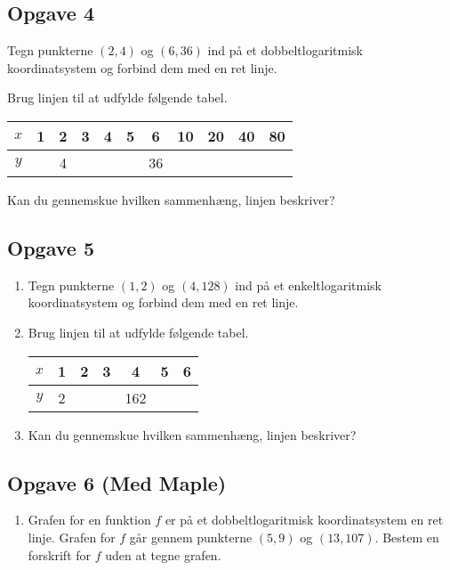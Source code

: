 \documentclass[12pt]{article}
\begin{document}
\subsection*{Opgave 4}

\begin{enumerate}[label=\roman*)]
	\item Tegn punkterne $(2,4)$ og $(6,36)$ ind på et dobbeltlogaritmisk koordinatsystem og forbind dem med 
	en ret linje.
	\item Brug linjen til at udfylde følgende tabel.
	\begin{center}
		\begin{tabular}{c|c|c|c|c|c|c|c|c|c|c}
			$x$ & 1 & 2 & 3 & 4 & 5 & 6 & 10 & 20 & 40 & 80 \\
			\hline
			$y$ & \phantom{1} & 4  & \phantom{8}  &\phantom{16} & \phantom{32}  & 36  & \phantom{128}  & \phantom{256}  & \phantom{512}  & \phantom{1024}
		\end{tabular}
	\item Kan du gennemskue hvilken sammenhæng, linjen beskriver? 
	\end{center}
\end{enumerate}

\subsection*{Opgave 5}
\begin{enumerate}[label=\roman*)]
	\item Tegn punkterne $(1,2)$ og $(4,128)$ ind på et enkeltlogaritmisk koordinatsystem og forbind dem med en ret 
	linje.
	\item Brug linjen til at udfylde følgende tabel.
	\begin{center}
		\begin{tabular}{c|c|c|c|c|c|c}
			$x$ & 1 & 2 & 3 & 4 & 5 & 6  \\
			\hline
			$y$ & 2 & \phantom{18} & \phantom{54} & 162 & \phantom{486}& \phantom{600}
		\end{tabular}
	\end{center}
	\item Kan du gennemskue hvilken sammenhæng, linjen beskriver? 
\end{enumerate}

\subsection*{Opgave 6 (Med Maple)}
\begin{enumerate}[label=\roman*)]
	\item Grafen for en funktion $f$ er på et dobbeltlogaritmisk koordinatsystem en ret linje. Grafen for $f$
	går gennem punkterne $(5,9)$ og $(13,107)$. Bestem en forskrift for $f$ uden at tegne grafen. 
\end{enumerate}
\end{document}
